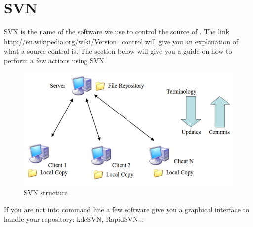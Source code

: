 \chapter{SVN}
%
SVN is the name of the software we use to control the source of \telemacsystem. The
link \url{http://en.wikipedia.org/wiki/Version_control} will give you an
explanation of what a source control is.
The section below will give you a guide on how to perform a few actions
using SVN.
%
\begin{figure}[H]
    \centering
    \includegraphics[scale=0.6]{graphics/svn-image.png}
    \caption{SVN structure}
    \label{fig:svn-struct}
\end{figure}
If you are not into command line a few software give you a graphical interface
to handle your repository: kdeSVN, RapidSVN...
%
%
